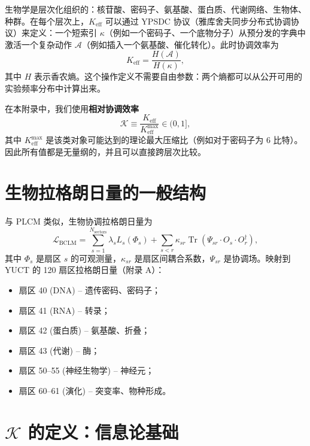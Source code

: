 \documentclass[12pt,a4paper]{article}
\newcommand{\REL}{\mathcal{K}}          %
\begin{document}
	生物学是层次化组织的：核苷酸、密码子、氨基酸、蛋白质、代谢网络、生物体、种群。在每个层次上，\(K_{\mathrm{eff}}\) 可以通过 YPSDC 协议（雅库舍夫同步分布式协调协议）来定义：一个短索引 \(\kappa\)（例如一个密码子、一个底物分子）从预分发的字典中激活一个复杂动作 \(\mathcal{A}\)（例如插入一个氨基酸、催化转化）。此时协调效率为
	\[
	K_{\mathrm{eff}} = \frac{H(\mathcal{A})}{H(\kappa)},
	\]
	其中 \(H\) 表示香农熵。这个操作定义不需要自由参数：两个熵都可以从公开可用的实验频率分布中计算出来。
	
	在本附录中，我们使用\textbf{相对协调效率}
	\[
	\REL \equiv \frac{K_{\mathrm{eff}}}{K_{\mathrm{eff}}^{\max}} \in (0,1],
	\]
	其中 \(K_{\mathrm{eff}}^{\max}\) 是该类对象可能达到的理论最大压缩比（例如对于密码子为 6 比特）。因此所有值都是无量纲的，并且可以直接跨层次比较。
	
	\section{生物拉格朗日量的一般结构}
	与 PLCM 类似，生物协调拉格朗日量为
	\begin{equation}
		\mathcal{L}_{\text{BCLM}} = \sum_{s=1}^{N_{\text{sectors}}} \lambda_s L_s(\Phi_s) + \sum_{s<r} \kappa_{sr} \operatorname{Tr}(\Psi_{sr} \cdot O_s \cdot O_r^\dagger),
		\label{eq:BCLM}
	\end{equation}
	其中 \(\Phi_s\) 是扇区 \(s\) 的可观测量，\(\kappa_{sr}\) 是扇区间耦合系数，\(\Psi_{sr}\) 是协调场。映射到 YUCT 的 120 扇区拉格朗日量（附录 A）：
	\begin{itemize}
		\item 扇区 40 (DNA) – 遗传密码、密码子；
		\item 扇区 41 (RNA) – 转录；
		\item 扇区 42 (蛋白质) – 氨基酸、折叠；
		\item 扇区 43 (代谢) – 酶；
		\item 扇区 50–55 (神经生物学) – 神经元；
		\item 扇区 60–61 (演化) – 突变率、物种形成。
	\end{itemize}
	
	\section{\(\REL\) 的定义：信息论基础}
	\label{sec:REL-def}
	
\end{document}
